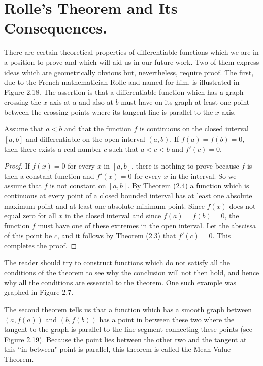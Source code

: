 \section{Rolle's Theorem and Its Consequences.}\label{sec 2.5} 
There are certain theoretical properties of differentiable functions which we are in a position to prove and which will aid us in our future work. Two of them express ideas which are geometrically obvious but, nevertheless, require proof. The first, due to the French mathematician Rolle and named for him, is illustrated in Figure \f{2.18}. The assertion is that a differentiable function which has a graph crossing the $x$-axis at a and also at $b$ must have on its graph at least one point between the crossing points where its tangent line is parallel to the $x$-axis.
 
\begin{prop}
\label{thm 2.5.1}
Assume that $a < b$ and that the function $f$ is continuous on the closed interval $[a, b]$ and differentiable on the open interval
$(a, b)$. If $f(a) = f(b) = 0$, then there exists a real number $c$ such that $a < c < b$ and $f'(c) = 0$.
\end{prop}


\begin{proof}
If $f(x) = 0$ for every $x$ in $[a, b]$, there is nothing to prove because $f$ is then a constant function and $f'(x) = 0$ for every $x$ in the interval. So we assume that $f$ is not constant on $[a,b]$. By Theorem (2.4) a function which is continuous at every point of a closed bounded interval has at least one absolute maximum point and at least one absolute minimum point. Since $f(x)$ does not equal zero for all $x$ in the closed interval and since $f(a) = f(b) = 0$, the function $f$ must have one of these extremes in the open interval. Let the abscissa of this point be $c$, and it follows by Theorem (2.3) that $f'(c) = 0$. This completes the proof.
\end{proof}

The reader should try to construct functions which do not satisfy all the conditions of the theorem to see why the conclusion will not then hold, and hence why all the conditions are essential to the theorem. One such example was graphed in Figure \f{2.7}.


The second theorem tells us that a function which has a smooth graph between $(a, f(a))$ and $(b, f(b))$ has a point in between these two where the
tangent to the graph is parallel to the line segment connecting these points (see Figure \f{2.19}). Because the point lies between the other two and the tangent at this ``in-between" point is parallel, this theorem is called the Mean Value Theorem.


